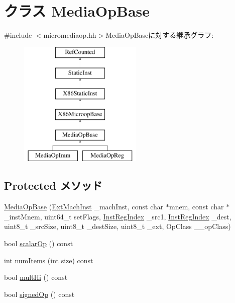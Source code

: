 \hypertarget{classX86ISA_1_1MediaOpBase}{
\section{クラス MediaOpBase}
\label{classX86ISA_1_1MediaOpBase}
}


{\ttfamily \#include $<$micromediaop.hh$>$}MediaOpBaseに対する継承グラフ:\begin{figure}[H]
\begin{center}
\leavevmode
\includegraphics[height=6cm]{classX86ISA_1_1MediaOpBase}
\end{center}
\end{figure}
\subsection*{Protected メソッド}
\begin{DoxyCompactItemize}
\item 
\hyperlink{classX86ISA_1_1MediaOpBase_a9dcb49788dc434343436068f657df37e}{MediaOpBase} (\hyperlink{structX86ISA_1_1ExtMachInst}{ExtMachInst} \_\-machInst, const char $\ast$mnem, const char $\ast$\_\-instMnem, uint64\_\-t setFlags, \hyperlink{structX86ISA_1_1InstRegIndex}{InstRegIndex} \_\-src1, \hyperlink{structX86ISA_1_1InstRegIndex}{InstRegIndex} \_\-dest, uint8\_\-t \_\-srcSize, uint8\_\-t \_\-destSize, uint8\_\-t \_\-ext, OpClass \_\-\_\-opClass)
\item 
bool \hyperlink{classX86ISA_1_1MediaOpBase_abc581ef39802e6cdf91f6115c0bda692}{scalarOp} () const 
\item 
int \hyperlink{classX86ISA_1_1MediaOpBase_abaed42f5a25261855b65b65a64288315}{numItems} (int size) const 
\item 
bool \hyperlink{classX86ISA_1_1MediaOpBase_a394db50a3c5ecab351a577b848c905ee}{multHi} () const 
\item 
bool \hyperlink{classX86ISA_1_1MediaOpBase_a0952f8b8fd79bd9037137f3422ceb349}{signedOp} () const 
\end{DoxyCompactItemize}

